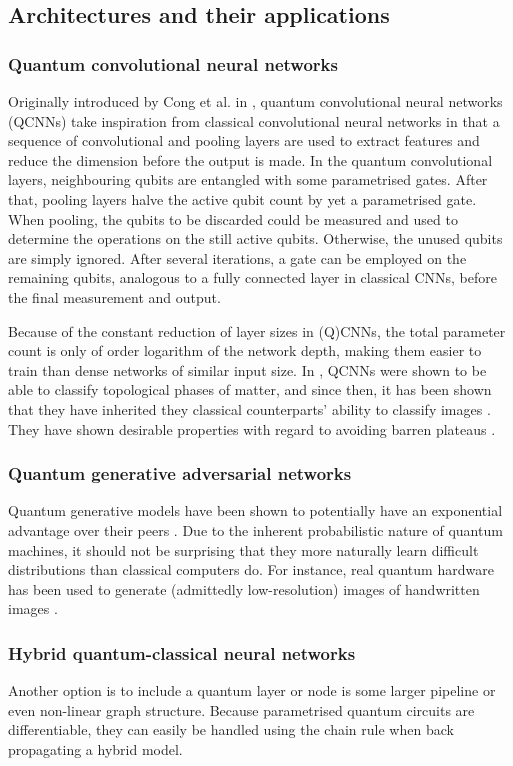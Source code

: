\subsection{Architectures and their applications}
\subsubsection{Quantum convolutional neural networks}
Originally introduced by Cong et al. in \cite{cong2019}, quantum convolutional neural networks (QCNNs) take inspiration from classical convolutional neural networks in that a sequence of convolutional and pooling layers are used to extract features and reduce the dimension before the output is made. In the quantum convolutional layers, neighbouring qubits are entangled with some parametrised gates. After that, pooling layers halve the active qubit count by yet a parametrised gate. When pooling, the qubits to be discarded could be measured and used to determine the operations on the still active qubits. Otherwise, the unused qubits are simply ignored. After several iterations, a gate can be employed on the remaining qubits, analogous to a fully connected layer in classical CNNs, before the final measurement and output.

Because of the constant reduction of layer sizes in (Q)CNNs, the total parameter count is only of order logarithm of the network depth, making them easier to train than dense networks of similar input size. In \cite{cong2019}, QCNNs were shown to be able to classify topological phases of matter, and since then, it has been shown that they have inherited they classical counterparts' ability to classify images \cite{oh2020}. They have shown desirable properties with regard to avoiding barren plateaus \cite{pesah2021}.

\subsubsection{Quantum generative adversarial networks}
Quantum generative models have been shown to potentially have an exponential advantage over their peers \cite{gao2018}. Due to the inherent probabilistic nature of quantum machines, it should not be surprising that they more naturally learn difficult distributions than classical computers do. For instance, real quantum hardware has been used to generate (admittedly low-resolution) images of handwritten images \cite{huang2021}.


\subsubsection{Hybrid quantum-classical neural networks}
Another option is to include a quantum layer or node is some larger pipeline or even non-linear graph structure. Because parametrised quantum circuits are differentiable, they can easily be handled using the chain rule when back propagating a hybrid model.

